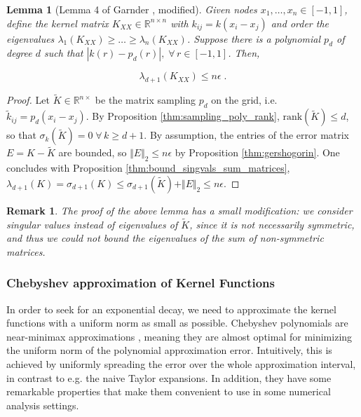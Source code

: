 \documentclass{article}
\newcommand{\R}{\mathbb R}
\newcommand{\norm}[1]{\Vert #1 \Vert}
\newtheorem{lemma}[theorem]{Lemma}
\newtheorem*{remark}{Remark}
\begin{document}
\begin{lemma}[Lemma 4 of Garnder \cite{gardner_gpytorch_2021}, modified] \label{thm:spectral_decay_poly_approx}
Given nodes $x_1, \ldots, x_n \in [-1, 1]$, define the kernel matrix $K_{XX} \in \R^{n\times n}$ with $k_{ij} = k(x_i - x_j)$ and order the eigenvalues $\lambda_1(K_{XX}) \ge \ldots \ge \lambda_n(K_{XX})$. Suppose there is a polynomial $p_{d}$ of degree $d$ such that $|k(r) - p_{d}(r)|, \; \forall \, r \in [-1, 1]$. Then,

\begin{equation*}
    \lambda_{d+1}(K_{XX}) \le n\epsilon \; .
\end{equation*}
\end{lemma}
\begin{proof}
Let $\tilde K \in \R^{n \times }$ be the matrix sampling $p_{d}$ on the grid, i.e. $\tilde k_{ij} = p_{d}(x_i-x_j)$. By Proposition \ref{thm:sampling_poly_rank}, $\text{rank}(\tilde K) \le d$, so that $\sigma_k(\tilde K) = 0 \; \forall \, k \ge d+1$. By assumption, the entries of the error matrix $E = K - \tilde K$ are bounded, so $\norm{E}_2 \le n\epsilon$ by Proposition \ref{thm:gershogorin}. One concludes with Proposition \ref{thm:bound_singvals_sum_matrices}, $\lambda_{d+1}(K) = \sigma_{d+1}(K) \le \sigma_{d+1}(\tilde  K) + \norm{E}_2 \le n \epsilon$.
\end{proof}

\begin{remark}
The proof of the above lemma has a small modification: we consider singular values instead of eigenvalues of $\tilde K$, since it is not necessarily symmetric, and thus we could not bound the eigenvalues of the sum of non-symmetric matrices. 
\end{remark}


\subsubsection{Chebyshev approximation of Kernel Functions}

In order to seek for an exponential decay, we need to approximate the kernel functions with a uniform norm as small as possible. Chebyshev polynomials are near-minimax approximations \cite{elliott_error_1987}, meaning they are almost optimal for minimizing the uniform norm of the polynomial approximation error. Intuitively, %
this is achieved by uniformly spreading the error over the whole approximation interval, in contrast to e.g. the naive Taylor expansions. %
In addition, they have some remarkable properties that make them convenient to use in some numerical analysis settings. 
\end{document}

